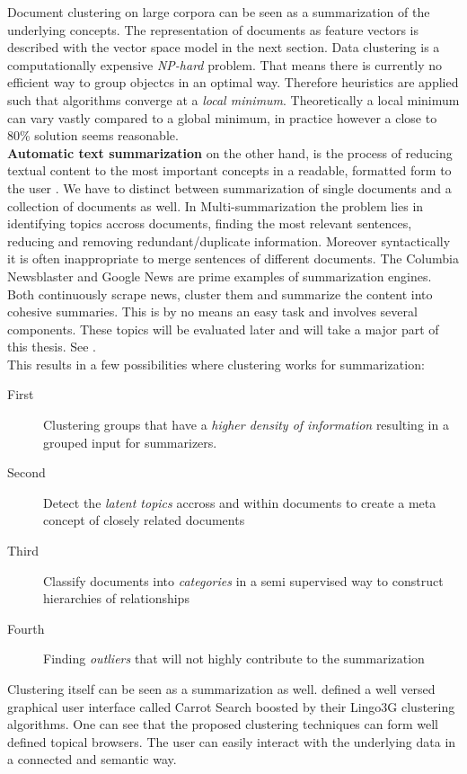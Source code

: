   Document clustering on large corpora can be seen as a summarization of the underlying concepts. The representation of documents as feature vectors is described with the vector space model in the next section. Data clustering is a computationally expensive \emph{NP-hard} problem. That means there is currently no efficient way to group objectcs in an optimal way. Therefore heuristics are applied such that algorithms converge at a  \emph{local minimum}. Theoretically a local minimum can vary vastly compared to a global minimum, in practice however a close to 80\% solution seems reasonable.\\
  \textbf{Automatic text summarization} on the other hand, is the process of reducing textual content to the most important concepts in a readable, formatted form to the user \cite{SumEvaluation2001}. We have to distinct between summarization of single documents and a collection of documents as well. In Multi-summarization the problem lies in identifying topics accross documents, finding the most relevant sentences, reducing and removing redundant/duplicate information. Moreover syntactically it is often inappropriate to merge sentences of different documents. The Columbia Newsblaster and Google News are prime examples of summarization engines. Both continuously scrape news, cluster them and summarize the content into cohesive summaries. This is by no means an easy task and involves several components. These topics will be evaluated later and will take a major part of this thesis. See \cite{NewsBlaster2002, ColumbiaExperimentsSum2002}.\\
  This results in a few possibilities where clustering works for summarization:
  
  \begin{description}
    \item[First] Clustering groups that have a \emph{higher density of information} resulting in a grouped input for summarizers.
    \item[Second] Detect the \emph{latent topics} accross and within documents to create a meta concept of closely related documents
    \item[Third] Classify documents into \emph{categories} in a semi supervised way to construct hierarchies of relationships
    \item[Fourth] Finding \emph{outliers} that will not highly contribute to the summarization
  \end{description}

  Clustering itself can be seen as a summarization as well. \cite{Carrot2Search2003} defined a well versed graphical user interface called Carrot Search boosted by their Lingo3G clustering algorithms. One can see that the proposed clustering techniques can form well defined topical browsers. The user can easily interact with the underlying data in a connected and semantic way.

